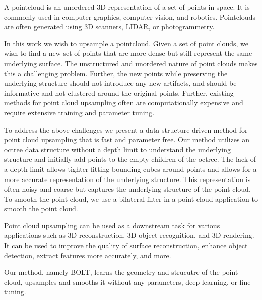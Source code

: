 A pointcloud is an unordered 3D representation of a set of points in space.
It is commonly used in computer graphics, computer vision, and robotics.
Pointclouds are often generated using 3D scanners, LIDAR, or photogrammetry.

In this work we wish to upsample a pointcloud. Given a set of point clouds, we wish to find a new set of points that are more dense but still represent the same underlying surface.
The unstructured and unordered nature of point clouds makes this a challenging problem. Further, the new points while preserving the underlying structure should not introduce any new artifacts, and should be informative and not clustered around the original points.
Further, existing methods for point cloud upsampling often are computationally expensive and require extensive training and parameter tuning. 

To address the above challenges we present a data-structure-driven method for point cloud upsampling that is fast and parameter free. 
Our method utilizes an octree data structure without a depth limit to understand the underlying structure and initially add points to the empty children of the octree.
The lack of a depth limit allows tighter fitting bounding cubes around points and allows for a more accurate representation of the underlying structure.
This representation is often noisy and coarse but captures the underlying structure of the point cloud. 
To smooth the point cloud, we use a bilateral filter in a point cloud application \cite{3d_bilateral_filter_ipol} to smooth the point cloud.

Point cloud upsampling can be used as a downstream task for various applications such as 3D reconstruction, 3D object recognition, and 3D rendering. 
It can be used to improve the quality of surface reconstruction, enhance object detection, extract features more accurately, and more. 

Our method, namely BOLT, learns the geometry and strucutre of the point cloud, upsamples and smooths it without any parameters, deep learning, or fine tuning.
